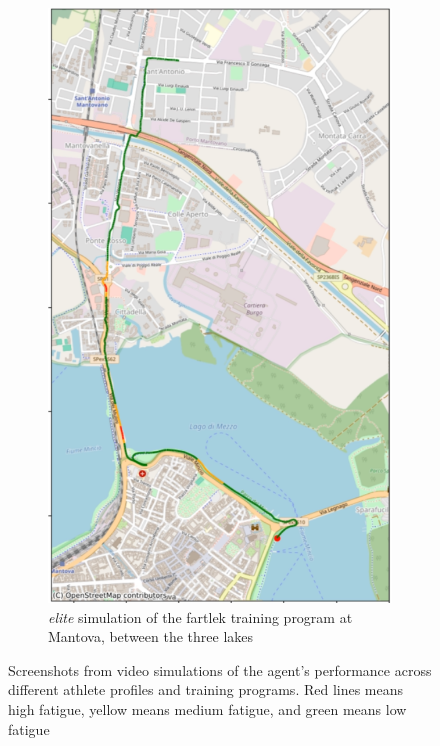 \begin{figure}[h!]
\begin{subfigure}[t]{0.31\textwidth}
        \includegraphics[width=\textwidth]{images/elite-fartlek.png}
        \caption{\textit{elite} simulation of the fartlek training program at Mantova, between the three lakes}
    \label{fig:video-elite}
    \end{subfigure}
    \caption{Screenshots from video simulations of the agent's performance across different athlete profiles and training programs. Red lines means high fatigue, yellow means medium fatigue, and green means low fatigue}
\end{figure}
